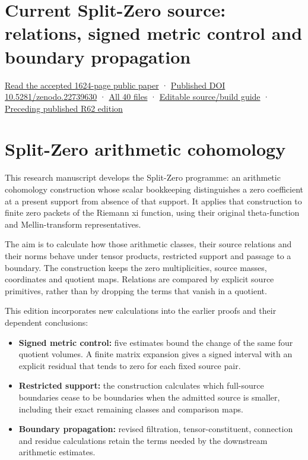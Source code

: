 \documentclass[
]{article}
\providecommand{\tightlist}{%
  \setlength{\itemsep}{0pt}\setlength{\parskip}{0pt}}
\begin{document}
\section{Current Split-Zero source: relations, signed metric control and
boundary
propagation}\label{current-split-zero-source-relations-signed-metric-control-and-boundary-propagation}

\href{https://zenodo.org/api/records/22739630/files/39-splitzero-recursive-source-relations-public-reader.pdf/content}{Read
the accepted 1624-page public paper} ·
\href{https://doi.org/10.5281/zenodo.22739630}{Published DOI
10.5281/zenodo.22739630} ·
\href{calculation_edition_20260914_recursive_source_relations/README.md}{All
40 files} ·
\href{workbenches/splitzero-tandem/continuations/20260914-recursive-source-relations/README.md}{Editable
source/build guide} ·
\href{https://doi.org/10.5281/zenodo.22738226}{Preceding published R62
edition}

\section{Split-Zero arithmetic
cohomology}\label{split-zero-arithmetic-cohomology}

This research manuscript develops the Split-Zero programme: an
arithmetic cohomology construction whose scalar bookkeeping
distinguishes a zero coefficient at a present support from absence of
that support. It applies that construction to finite zero packets of the
Riemann xi function, using their original theta-function and
Mellin-transform representatives.

The aim is to calculate how those arithmetic classes, their source
relations and their norms behave under tensor products, restricted
support and passage to a boundary. The construction keeps the zero
multiplicities, source masses, coordinates and quotient maps. Relations
are compared by explicit source primitives, rather than by dropping the
terms that vanish in a quotient.

This edition incorporates new calculations into the earlier proofs and
their dependent conclusions:

\begin{itemize}
\tightlist
\item
  \textbf{Signed metric control:} five estimates bound the change of the
  same four quotient volumes. A finite matrix expansion gives a signed
  interval with an explicit residual that tends to zero for each fixed
  source pair.
\item
  \textbf{Restricted support:} the construction calculates which
  full-source boundaries cease to be boundaries when the admitted source
  is smaller, including their exact remaining classes and comparison
  maps.
\item
  \textbf{Boundary propagation:} revised filtration, tensor-constituent,
  connection and residue calculations retain the terms needed by the
  downstream arithmetic estimates.
\end{itemize}
\end{document}
